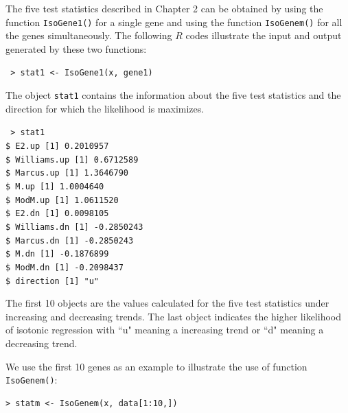 The five test statistics described in Chapter 2 can be obtained by
using the function \texttt{IsoGene1()} for a single gene and using
the function \texttt{IsoGenem()} for all the genes simultaneously.
The following $R$ codes illustrate the input and output generated by
these two functions:
\begin{center}
\begin{boxit}
\texttt{
> stat1 <- IsoGene1(x, gene1)}
\end{boxit}
\end{center}
The object \texttt{stat1} contains the information about the five test statistics and the direction for which the likelihood is maximizes.
\begin{center}
\begin{boxit}
\texttt{
> stat1\\
\$ E2.up [1] 0.2010957\\
\$ Williams.up [1] 0.6712589\\
\$ Marcus.up [1] 1.3646790\\
\$ M.up [1] 1.0004640\\
\$ ModM.up [1] 1.0611520\\
\$ E2.dn [1] 0.0098105\\
\$ Williams.dn [1] -0.2850243\\
\$ Marcus.dn [1] -0.2850243\\
\$ M.dn [1] -0.1876899\\
\$ ModM.dn [1] -0.2098437\\
\$ direction [1] "u" }
\end{boxit}
\end{center}

The first 10 objects are the values calculated for the five test
statistics under increasing and decreasing trends. The last object
indicates the higher likelihood of isotonic regression with ``u"
meaning a increasing trend or ``d" meaning a decreasing trend.


We use the first 10 genes as an example to illustrate the use of
function \texttt{IsoGenem()}:
\begin{center}
\begin{boxit}
\begin{verbatim}
> statm <- IsoGenem(x, data[1:10,])
\end{verbatim}
\end{boxit}
\end{center}

